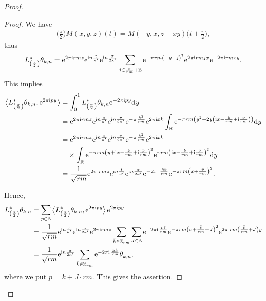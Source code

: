 \documentclass[pdftex]{sigma}
\newcommand\Z{{\mathbb Z}}
\newcommand\R{{\mathbb R}}
\newcommand\la{\langle}
\newcommand\ra{\rangle}
\numberwithin{equation}{section}
\begin{document}
\begin{proof}
\begin{proof}
We have
\begin{gather*}
 \bigg(\frac{\pi}{2}\bigg)M(x,y,z)(t)=M(-y,x,z-xy)\bigg(t+\frac{\pi}{2}\bigg),
 \end{gather*}
thus
\begin{gather*}
L^*_{\left(\frac{\pi}{2}\right)}\theta_{k,n}={\rm e}^{2\pi {\rm i}rmz}{\rm e}^{{\rm i}n\frac{t}{\kappa'}}{\rm e}^{{\rm i}n\frac{\pi}{2\kappa'}}
\sum_{j\in\frac{k}{rm}+\Z}{\rm e}^{-\pi rm(-y+j)^2}{\rm e}^{2\pi {\rm i}rmjx}{\rm e}^{-2\pi {\rm i}rmxy}.
\end{gather*}
This implies
\begin{align*}
\big\la L^*_{\left(\frac{\pi}{2}\right)}\theta_{k,n}, {\rm e}^{2\pi {\rm i}py}\big \ra & =
\int_0^1 L^*_{\left(\frac{\pi}{2}\right)}\theta_{k,n}{\rm e}^{-2\pi {\rm i}py} {\rm d}y
\\
&={\rm e}^{2\pi {\rm i}rmz}{\rm e}^{{\rm i}n\frac{t}{\kappa'}}{\rm e}^{{\rm i}n \frac{\pi}{2\kappa'}}
{\rm e}^{-\pi \frac{k^2}{rm}}{\rm e}^{2\pi {\rm i}xk}\int_{\R} {\rm e}^{-\pi rm\left(y^2+2y\left({\rm i}x-\frac k{rm}+{\rm i}\frac p{rm}\right)\right)}{\rm d}y
 \\
&={\rm e}^{2\pi {\rm i}rmz}{\rm e}^{{\rm i}n\frac{t}{\kappa'}}{\rm e}^{{\rm i}n\frac{\pi}{2\kappa'}}{\rm e}^{-\pi \frac{k^2}{rm}}{\rm e}^{2\pi {\rm i}xk} \\
&\quad \times\int_{\R} {\rm e}^{-\pi rm\left(y+{\rm i}x-\frac{k}{rm}+{\rm i}\frac{p}{rm}\right)^2}
{\rm e}^{\pi rm\left({\rm i}x-\frac{k}{rm}+{\rm i}\frac{p}{rm}\right)^2}{\rm d}y
\\
&=\frac{1}{\sqrt{rm}}{\rm e}^{2\pi {\rm i}rmz}{\rm e}^{{\rm i}n\frac{t}{\kappa'}}{\rm e}^{{\rm i}n\frac{\pi}{2\kappa'}}
{\rm e}^{-2\pi {\rm i}\,\frac{kp}{rm}}{\rm e}^{-\pi rm\left(x+\frac{p}{rm}\right)^2}.
\end{align*}

Hence,
\begin{align*}
L^*_{\left(\frac{\pi}{2}\right)} \theta_{k,n}&
=\sum_{p\in\Z} \big\la L^*_{\left(\frac{\pi}{2}\right)} \theta_{k,n}, {\rm e}^{2\pi {\rm i}py}\big\ra \,{\rm e}^{2\pi {\rm i}py}
\\
&=\frac1{\sqrt{rm}}{\rm e}^{{\rm i}n\frac t{\kappa'}}{\rm e}^{{\rm i}n\frac{\pi}{2\kappa'}}{\rm e}^{2\pi {\rm i}rmz}\sum_{\bar k\in\Z_{rm}}\sum_{J\in\Z} {\rm e}^{-2\pi {\rm i}\,\frac{k\bar k}{rm}}{\rm e}^{-\pi rm\left(x+\frac{\bar k}{rm}+J\right)^2}{\rm e}^{2\pi {\rm i} rm \left(\frac{\bar k}{rm}+J\right)y}
\\
&= \frac{1}{\sqrt{rm}}{\rm e}^{{\rm i}n\frac{\pi}{2\kappa'}}\sum_{\bar k\in\Z_{rm}}{\rm e}^{-2\pi {\rm i}\,\frac{k\bar k}{rm}}\theta_{\bar k,n},
\end{align*}
where we put $p=\bar k+J\cdot rm$. This gives the assertion.
\end{proof}


\end{proof}
\end{document}
